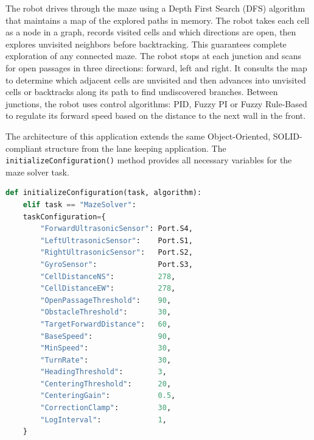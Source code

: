 The robot drives through the maze using a Depth First Search (DFS) algorithm that maintains a map of the explored paths in memory. The robot takes each cell as a node in a graph, records visited cells and which directions are open, then explores unvisited neighbors before backtracking. This guarantees complete exploration of any connected maze. The robot stops at each junction and scans for open passages in three directions: forward, left and right. It consults the map to determine which adjacent cells are unvisited and then advances into unvisited cells or backtracks along its path to find undiscovered branches. Between junctions, the robot uses control algorithms: PID, Fuzzy PI or Fuzzy Rule-Based to regulate its forward speed based on the distance to the next wall in the front.

The architecture of this application extends the same Object-Oriented, SOLID-compliant structure from the lane keeping application. The \texttt{initializeConfiguration()} method provides all necessary variables for the maze solver task.

\begin{lstlisting}[language=Python, caption={MazeSolver task configuration}, label={lst:lk-init}]
def initializeConfiguration(task, algorithm):
    elif task == "MazeSolver":
    taskConfiguration={
        "ForwardUltrasonicSensor": Port.S4,   
        "LeftUltrasonicSensor":    Port.S1,
        "RightUltrasonicSensor":   Port.S2,   
        "GyroSensor":              Port.S3,
        "CellDistanceNS":          278,
        "CellDistanceEW":          278,
        "OpenPassageThreshold":    90,
        "ObstacleThreshold":       30,
        "TargetForwardDistance":   60,
        "BaseSpeed":               90,
        "MinSpeed":                30,
        "TurnRate":                30,
        "HeadingThreshold":        3,
        "CenteringThreshold":      20,
        "CenteringGain":           0.5,
        "CorrectionClamp":         30,
        "LogInterval":             1,
    }
\end{lstlisting}

